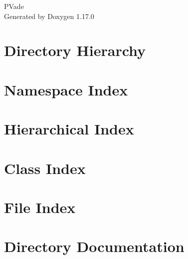 \documentclass[twoside]{book}
\newcommand{\+}{\discretionary{\mbox{\scriptsize$\hookleftarrow$}}{}{}}
\newcommand{\clearemptydoublepage}{%
    \newpage{\pagestyle{empty}\cleardoublepage}%
  }
\begin{document}
  \raggedbottom
    \hypersetup{pageanchor=false,
                bookmarksnumbered=true,
                pdfencoding=unicode
               }
  \begin{titlepage}
  \vspace*{7cm}
  \begin{center}%
  {\Large PVade}\\
  \vspace*{1cm}
  {\large Generated by Doxygen 1.17.0}\\
  \end{center}
  \end{titlepage}
  \clearemptydoublepage
  \tableofcontents
  \clearemptydoublepage
  \hypersetup{pageanchor=true}
\chapter{Directory Hierarchy}

\chapter{Namespace Index}

\chapter{Hierarchical Index}

\chapter{Class Index}

\chapter{File Index}

\chapter{Directory Documentation}














\end{document}
